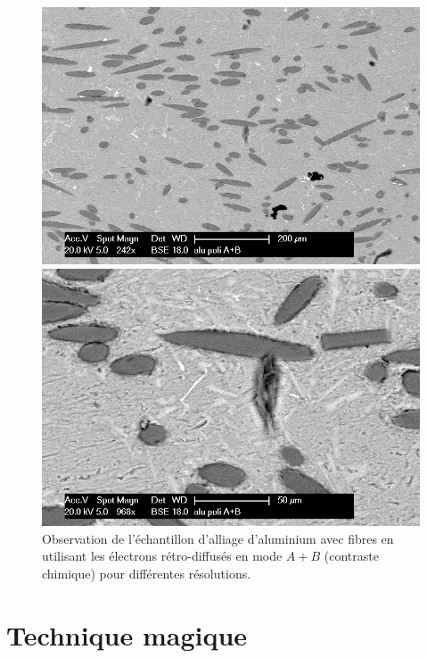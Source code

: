 \documentclass[a4paper,12pt]{article}
\begin{document}
\begin{figure}
\begin{minipage}[c]{.5\linewidth}
\centering
\includegraphics[width=1\textwidth]{images/alu_er_apb.png}
 \end{minipage}\hfill
\begin{minipage}[c]{.5\linewidth}
\centering
\includegraphics[width=1\textwidth]{images/alu_er_apb_g.png}
\end{minipage}
\caption{Observation de l'échantillon d'alliage d'aluminium avec fibres en utilisant les électrons rétro-diffusés en mode $A+B$ (contraste chimique) pour différentes résolutions.}
\label{fig:alu_poli_a+b}
\end{figure}

\section{Technique magique}
\end{document}
